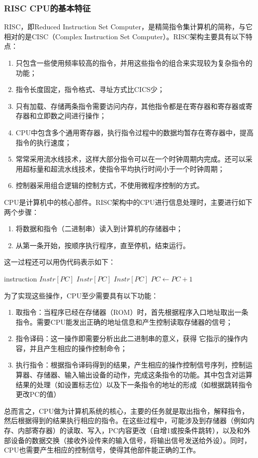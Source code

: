 \documentclass[titlepage, 11pt]{article}
\begin{document}
	\subsubsection{RISC CPU的基本特征}
	RISC，即Reduced Instruction Set Computer，是精简指令集计算机的简称，与它相对的是CISC（Complex Instruction Set Computer）。RISC架构主要具有以下特点：
	\begin{enumerate}
	\item 只包含一些使用频率较高的指令，并用这些指令的组合来实现较为复杂指令的功能；
	\item 指令长度固定，指令格式、寻址方式比CICS少；
	\item 只有加载、存储两条指令需要访问内存，其他指令都是在寄存器和寄存器或寄存器和立即数之间进行操作；
	\item CPU中包含多个通用寄存器，执行指令过程中的数据均暂存在寄存器中，提高指令的执行速度；
	\item 常常采用流水线技术，这样大部分指令可以在一个时钟周期内完成。还可以采用超标量和超流水线技术，使指令平均执行时间小于一个时钟周期；
	\item 控制器采用组合逻辑的控制方式，不使用微程序控制的方式。
	\end{enumerate}\par 
	CPU是计算机中的核心部件。RISC架构中的CPU进行信息处理时，主要进行如下两个步骤：
	\begin{enumerate}
		\item 将数据和指令（二进制串）读入到计算机的存储器中；
		\item 从第一条开始，按顺序执行程序，直至停机，结束运行。
	\end{enumerate}
	这一过程还可以用伪代码表示如下：
	\begin{codebox}
		\zi{}
		\li\While{}
		\Do\li{} instruction $Instr[PC]$
		\li {}  $Instr[PC]$
		\li{} $Instr[PC]$
		\li $PC\gets PC+1$
	\end{codebox}\par 
	为了实现这些操作，CPU至少需要具有以下功能：
	\begin{enumerate}
		\item 取指令：当程序已经在存储器（ROM）时，首先根据程序入口地址取出一条指令。需要CPU能发出正确的地址信息和产生控制读取存储器的信号；
		\item 指令译码：这一操作即需要分析出此二进制串的意义，获得
		它指示的操作内容，并且产生相应的操作控制命令；		
		\item 执行指令：根据指令译码得到的结果，产生相应的操作控制信号序列，控制运算器、存储器、输入输出设备的动作，完成这条指令的功能。其中包含对运算结果的处理（如设置标志位）以及下一条指令的地址的形成（如根据跳转指令更改PC的值）
	\end{enumerate}\par 
	总而言之，CPU做为计算机系统的核心，主要的任务就是取出指令，解释指令，然后根据得到的结果执行相应的指令。在这些过程中，可能涉及到存储器（例如内存、内部寄存器）的读取、写入，PC内容更改（自增1或按条件跳转），以及和外部设备的数据交换（接收外设传来的输入信号，将输出信号发送给外设）。同时，CPU也需要产生相应的控制信号，使得其他部件能正确的工作。
\end{document}
